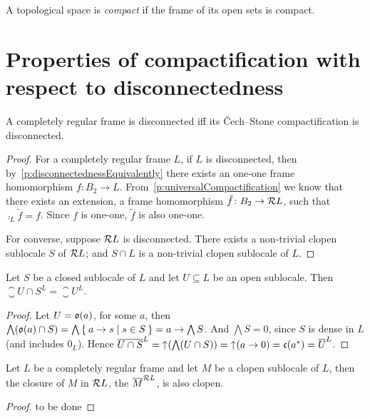 \begin{definition}
    A topological space is \emph{compact} if the frame of its open sets is compact.
\end{definition}


\section{Properties of compactification with respect to disconnectedness}

\begin{proposition}
    A completely regular frame is disconnected iff its Čech--Stone compactification is disconnected.
\end{proposition}
\begin{proof}
    For a completely regular frame $L$, if $L$ is disconnected, then by~\ref{p:disconnectednessEquivalently} there exists an one-one frame homomorphism $f\colon B_2\to L$. From~\ref{p:universalCompactification} we know that there exists an extension, a frame homomorphism $\tilde f\colon B_2\to \mathcal{R} L$, such that $\comp_L \tilde f = f$. Since $f$ is one-one, $\tilde f$ is also one-one.

    For converse, suppose $\mathcal{R} L$ is disconnected. There exists a non-trivial clopen sublocale $S$ of $\mathcal{R} L$; and $S\cap L$ is a non-trivial clopen sublocale of $L$.
\end{proof}

\begin{lemma}\label{p:closureIntersectedByDense}
    Let $S$ be a closed sublocale of $L$ and let $U\subseteq L$ be an open sublocale. Then $\closure{U\cap S}^L = \closure{U}^L$.
\end{lemma}
\begin{proof}
    Let $U = \mathfrak{o}(a)$, for some $a$, then $\bigwedge (\mathfrak{o}(a)\cap S) = \bigwedge \Set{ a\to s | s \in S } = a\to \bigwedge S$. And $\bigwedge S = 0$, since $S$ is dense in $L$ (and includes $0_L$). Hence $\overline{U\cap S}^L = \mathord{\uparrow}\mkern1mu (\bigwedge (U\cap S)) = \mathord{\uparrow}\mkern1mu(a\to 0) = \mathfrak{c}(a^*) = \overline{U}^L$.
\end{proof}

\begin{lemma}\label{p:closureOfClopen}
    Let $L$ be a completely regular frame and let $M$ be a clopen sublocale of $L$, then the closure of $M$ in $\mathcal{R} L$, the $\overline{M}^{\mathcal{R} L}$, is also clopen.
\end{lemma}
\begin{proof}
to be done
\end{proof}

